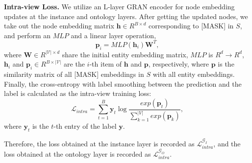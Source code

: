 \documentclass[letterpaper]{article} \usepackage{aaai23}  \usepackage{times}  \usepackage{helvet}  \usepackage{courier}  \usepackage[hyphens]{url}  \usepackage{graphicx} \urlstyle{rm} \def\UrlFont{\rm}  \usepackage{natbib}  \usepackage{caption} \frenchspacing  \setlength{\pdfpagewidth}{8.5in}  \setlength{\pdfpageheight}{11in}  \usepackage{times}
\begin{document}
\textbf{Intra-view Loss. } We utilize an L-layer GRAN encoder for node embedding updates at the instance and ontology layers. After getting the updated nodes, we take out the node embedding matrix $\mathbf{h}\in R^{B\times d}$ corresponding to [MASK] in $S$, and perform an $MLP$ and a linear layer operation,
\begin{equation}
\mathbf{p}_i=MLP\left( \mathbf{h}_i \right)\mathbf{W}^T,
\end{equation}
where $\mathbf{W}\in R^{|\mathcal{V}|\times d}$ share the initial entity embedding matrix, $MLP$ is $R^{d}\rightarrow R^{d}$, $\mathbf{h}_i$ and $\mathbf{p}_i\in R^{B\times |\mathcal{V}|}$ are the $i$-th item of $\mathbf{h}$ and $\mathbf{p}$, respectively, where $\mathbf{p}$ is the similarity matrix of all [MASK] embeddings in $S$ with all entity embeddings. Finally, the cross-entropy with label smoothing between the prediction and the label is calculated as the intra-view training loss:
\begin{equation}
\mathcal{L}_{intra}=\sum_{t=1}^B{\mathbf{y}_t\log \frac{exp\left( \mathbf{p}_t \right)}{\sum_{k=1}^{|V|}{exp\left( \mathbf{p}_k \right)}}},
\end{equation}
where $\mathbf{y}_t$ is the $t$-th entry of the label $\mathbf{y}$.

Therefore, the loss obtained at the instance layer is recorded as $\mathcal{L}_{intra}^{\mathcal{G}_I}$, and the loss obtained at the ontology layer is recorded as $\mathcal{L}_{intra}^{\mathcal{G}_O}$.
\end{document}
